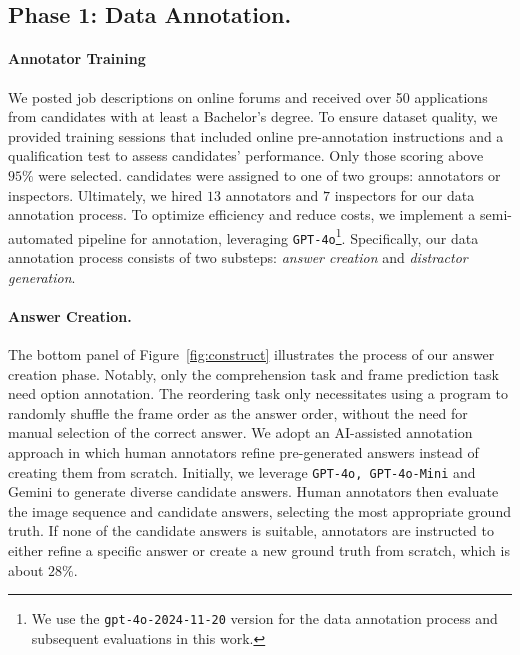
\subsection{Phase 1: Data Annotation.}

\paragraph{Annotator Training}
We posted job descriptions on online forums and received over 50 applications from candidates with at least a Bachelor's degree. To ensure dataset quality, we provided training sessions that included online pre-annotation instructions and a qualification test to assess candidates' performance. Only those scoring above $95\%$ were selected. candidates were assigned to one of two groups: annotators or inspectors. Ultimately, we hired $13$ annotators and $7$ inspectors for our data annotation process.
To optimize efficiency and reduce costs, we implement a semi-automated pipeline for \dataset annotation, leveraging \texttt{GPT-4o}\footnote{We use the \texttt{gpt-4o-2024-11-20} version for the data annotation process and subsequent evaluations in this work.}. Specifically, our data annotation process consists of two substeps: \textit{answer creation} and \textit{distractor generation}.

\paragraph{Answer Creation.}
The bottom panel of Figure~\ref{fig:construct} illustrates the process of our answer creation phase. Notably, only the comprehension task and frame prediction task need option annotation. The reordering task only necessitates using a program to randomly shuffle the frame order as the answer order, without the need for manual selection of the correct answer. We adopt an AI-assisted annotation approach in which human annotators refine pre-generated answers instead of creating them from scratch. Initially, we leverage \texttt{GPT-4o, GPT-4o-Mini} \cite{hurst2024gpt40} and Gemini \cite{reid2024gemini} to generate diverse candidate answers. Human annotators then evaluate the image sequence and candidate answers, selecting the most appropriate ground truth. If none of the candidate answers is suitable, annotators are instructed to either refine a specific answer or create a new ground truth from scratch, which is about $28\%$. 

